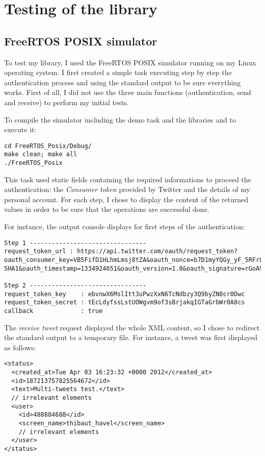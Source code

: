 \chapter{Testing of the library}


\section{FreeRTOS POSIX simulator}

\hspace{15mm}To test my library, I used the FreeRTOS POSIX simulator running on my Linux operating system. I first created a simple task executing step by step the authentication process and using the standard output to be sure everything works. First of all, I did not use the three main functions (authentication, send and receive) to perform my initial tests.

To compile the simulator including the demo task and the libraries and to execute it:
\begin{lstlisting}
cd FreeRTOS_Posix/Debug/
make clean; make all
./FreeRTOS_Posix
\end{lstlisting}

This task used static fields containing the required informations to proceed the authentication: the \textit{Consumer token} provided by Twitter and the details of my personal account. For each step, I chose to display the content of the returned values in order to be sure that the operations are successful done.

For instance, the output console displays for first steps of the authentication:
\begin{lstlisting}
Step 1 --------------------------------
request_token_url : https://api.twitter.com/oauth/request_token?oauth_consumer_key=VB5FifD1HLhmLmsj8tZA&oauth_nonce=b7D1myYQGy_yF_5RFrLs0&oauth_signature_method=HMAC-SHA1&oauth_timestamp=1334924651&oauth_version=1.0&oauth_signature=rGoA99tkEd%2B7%2F2RpSvZOzm%2FqVWI%3D 

Step 2 --------------------------------
request_token_key    : ebvnwX6MslItt3uPwzXxN6TcNdbzy3Q9byZN0cr0Dwc 
request_token_secret : tEcLdyfssLstUOWgvm9of3sBrjakqIGTaGrbWr0A8cs 
callback             : true 
\end{lstlisting}

The \textit{receive tweet} request displayed the whole XML content, so I chose to redirect the standard output to a temporary file. For instance, a tweet was first displayed as follows:\clearpage
\begin{lstlisting}
<status>
  <created_at>Tue Apr 03 16:23:32 +0000 2012</created_at>
  <id>187213757825564672</id>
  <text>Multi-tweets test.</text>
  // irrelevant elements
  <user>
    <id>488884688</id>
    <screen_name>thibaut_havel</screen_name>
    // irrelevant elements
  </user>
</status>
\end{lstlisting}


